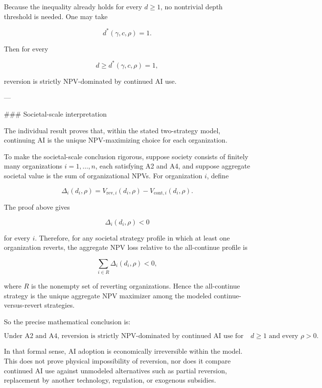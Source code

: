 Because the inequality already holds for every \(d\ge 1\), no nontrivial depth threshold is needed. One may take

\[
d^*(\gamma,c,\rho)=1.
\]

Then for every

\[
d\ge d^*(\gamma,c,\rho)=1,
\]

reversion is strictly NPV-dominated by continued AI use.

---

### Societal-scale interpretation

The individual result proves that, within the stated two-strategy model, continuing AI is the unique NPV-maximizing choice for each organization.

To make the societal-scale conclusion rigorous, suppose society consists of finitely many organizations \(i=1,\dots,n\), each satisfying A2 and A4, and suppose aggregate societal value is the sum of organizational NPVs. For organization \(i\), define

\[
\Delta_i(d_i,\rho)
=
V_{\mathrm{rev},i}(d_i,\rho)
-
V_{\mathrm{cont},i}(d_i,\rho).
\]

The proof above gives

\[
\Delta_i(d_i,\rho)<0
\]

for every \(i\). Therefore, for any societal strategy profile in which at least one organization reverts, the aggregate NPV loss relative to the all-continue profile is

\[
\sum_{i\in R}\Delta_i(d_i,\rho)<0,
\]

where \(R\) is the nonempty set of reverting organizations. Hence the all-continue strategy is the unique aggregate NPV maximizer among the modeled continue-versus-revert strategies.

So the precise mathematical conclusion is:

\[
\boxed{
\text{Under A2 and A4, reversion is strictly NPV-dominated by continued AI use for every } d\ge 1 \text{ and every } \rho>0.
}
\]

In that formal sense, AI adoption is economically irreversible within the model. This does not prove physical impossibility of reversion, nor does it compare continued AI use against unmodeled alternatives such as partial reversion, replacement by another technology, regulation, or exogenous subsidies.